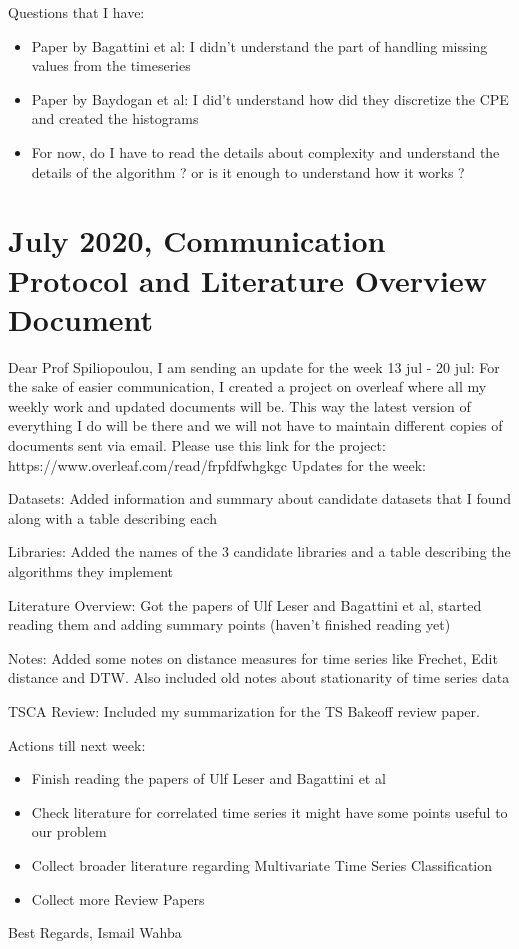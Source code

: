 \documentclass{article}
\newcommand{\cmark}{\ding{51}}%
\newcommand{\done}{\rlap{$\square$}{\raisebox{2pt}{\large\hspace{1pt}\cmark}}%
\hspace{-2.5pt}}
\begin{document}
Questions that I have:
\begin{itemize}
	\item Paper by Bagattini et al: I didn't understand the part of handling missing values from the timeseries
	\item Paper by Baydogan et al: I did't understand how did they discretize the CPE and created the histograms
	\item For now, do I have to read the details about complexity and understand the details of the algorithm ? or is it enough to understand how it works ?
\end{itemize}

 \section*{\texorpdfstring{}. July 2020, Communication Protocol and Literature Overview Document}
 Dear Prof Spiliopoulou,\newline
I am sending an update for the week 13 jul - 20 jul:
For the sake of easier communication, I created a project on overleaf where all my weekly work and updated documents will be. This way the latest version of everything I do will be there and we will not have to maintain different copies of documents sent via email.\newline
Please use this link for the project: https://www.overleaf.com/read/frpfdfwhgkgc
Updates for the week:
 \begin{todolist}
	\item [\done] Datasets: Added information and summary about candidate datasets that I found along with a table describing each
	\item [\done] Libraries: Added the names of the 3 candidate libraries and a table describing the algorithms they implement
	\item [\done] Literature Overview: Got the papers of Ulf Leser and Bagattini et al, started reading them and adding summary points (haven't finished reading yet)
	\item [\done] Notes: Added some notes on distance measures for time series like Frechet, Edit distance and DTW. Also included old notes about stationarity of time series data
	\item [\done] TSCA Review: Included my summarization for the TS Bakeoff review paper.
 \end{todolist}
 Actions till next week:
\begin{itemize}
	\item Finish reading the papers of Ulf Leser and Bagattini et al
	\item Check literature for correlated time series it might have some points useful to our problem
	\item Collect broader literature regarding Multivariate Time Series Classification
	\item Collect more Review Papers
\end{itemize}
Best Regards,
Ismail Wahba
\end{document}
